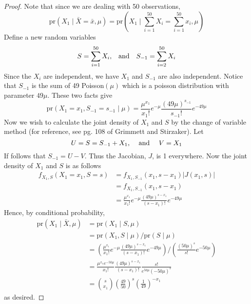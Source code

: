 \documentclass[letterpaper, 12pt]{article}
\newcommand{\pr}{\text{pr}}
\newcommand{\sbs}{\;|\;} %
\begin{document}
\begin{enumerate}
\begin{enumerate}[(i)]
\begin{proof}
Note that since we are dealing with 50 observations, 
\begin{equation}
\pr(X_1 \sbs \bar{X} = \bar{x}, \mu) = \pr (X_1 \sbs \sum_{i=1}^{50} X_i = \sum_{i=1}^{50} x_i, \mu)
\end{equation}
Define a new random variables
\begin{equation}
S = \sum_{i=1}^{50} X_i \text
{,\quad and\quad } 
S_{-1} = \sum_{i=2}^{50} X_i
\end{equation}
Since the $X_i$ are independent, we have $X_1$ and $S_{-1}$ are also independent. Notice that $S_{-1}$ is the sum of 49 Poisson$(\mu)$ which is a poisson distribution with parameter $49 \mu$. These two facts give
\begin{equation}
\pr(X_1 = x_1, S_{-1} = s_{-1} \sbs \mu) = 
\frac{\mu^{x_1}}{x_1!} e^{-\mu} \frac{(49\mu)^{s_{-1}}}{s_{-1}!} e^{-49\mu}
\end{equation}
Now we wish to calculate the joint density of $X_1$ and $S$ by the change of variable method (for reference, see pg. 108 of Grimmett and Stirzaker). Let 
\begin{equation}
U = S = S_{-1} + X_1 
\text{, \quad and \quad } 
V = X_1
\end{equation}
If follows that $S_{-1} = U - V$. Thus the Jacobian, $J$, is 1 everywhere. Now the joint density of $X_1$ and $S$ is as follows
\begin{align}
f_{X_1, S} (X_1 = x_1, S = s) 
&= f_{X_1, S_{-1}} (x_1, s - x_1) | J (x_1, s)| \\
&= f_{X_1, S_{-1}} (x_1, s - x_1) \\
&= \frac{\mu^{x_1}}{x_1!} e^{-\mu} \frac{(49\mu)^{s - x_1}}{(s-x_1)!} e^{-49\mu}
\end{align}
Hence, by conditional probability,
\begin{align}
\pr(X_1 \sbs \bar{X}, \mu) &= \pr (X_1 \sbs S, \mu) \\ 
&= \pr(X_1, S \sbs \mu) / \pr(S \sbs \mu) \\
&= 
\left(\frac{\mu^{x_1}}{x_1!} e^{-\mu} \frac{(49\mu)^{s - x_1}}{(s-x_1)!} e^{-49\mu} \right)
/
\left( \frac{(50\mu)^{s}}{s!} e^{-50\mu} \right) \\
&= 
\frac{\mu^{x_1} e^{-50\mu}}{x_1!} \frac{(49\mu)^{s - x_1}}{(s-x_1)!}  
\frac{s!}{e^{50\mu}(-50\mu)^{s}}  \\
&=
\binom{s}{x_1} 
\left(\frac{49}{50}\right)^s 
\left( \frac{1}{49} \right)^{-x_1}
\end{align}
as desired.
\end{proof}


\end{enumerate}
\end{enumerate}
\end{document}
